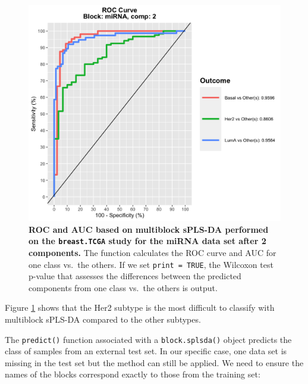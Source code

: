 \documentclass[]{book}
\newenvironment{Shaded}{\begin{snugshade}}{\end{snugshade}}
\newcommand{\CommentTok}[1]{\textcolor[rgb]{0.56,0.35,0.01}{\textit{#1}}}
\newcommand{\DataTypeTok}[1]{\textcolor[rgb]{0.13,0.29,0.53}{#1}}
\newcommand{\KeywordTok}[1]{\textcolor[rgb]{0.13,0.29,0.53}{\textbf{#1}}}
\newcommand{\NormalTok}[1]{#1}
\newcommand{\OperatorTok}[1]{\textcolor[rgb]{0.81,0.36,0.00}{\textbf{#1}}}
\newcommand{\StringTok}[1]{\textcolor[rgb]{0.31,0.60,0.02}{#1}}
\begin{document}
\begin{figure}

{\centering \includegraphics[width=0.5\linewidth]{Figures/DIABLO/diablo-auroc-1} 

}

\caption{\textbf{ROC and AUC based on multiblock sPLS-DA performed on the \texttt{breast.TCGA} study for the miRNA data set after 2 components.} The function calculates the ROC curve and AUC for one class vs.~the others. If we set \texttt{print\ =\ TRUE}, the Wilcoxon test p-value that assesses the differences between the predicted components from one class vs.~the others is output.}\label{fig:diablo-auroc}
\end{figure}



Figure \ref{fig:diablo-auroc} shows that the Her2 subtype is the most difficult to classify with multiblock sPLS-DA compared to the other subtypes.

The \texttt{predict()} function associated with a \texttt{block.splsda()} object predicts the class of samples from an external test set. In our specific case, one data set is missing in the test set but the method can still be applied. We need to ensure the names of the blocks correspond exactly to those from the training set:

\begin{Shaded}
\end{Shaded}
\end{document}
